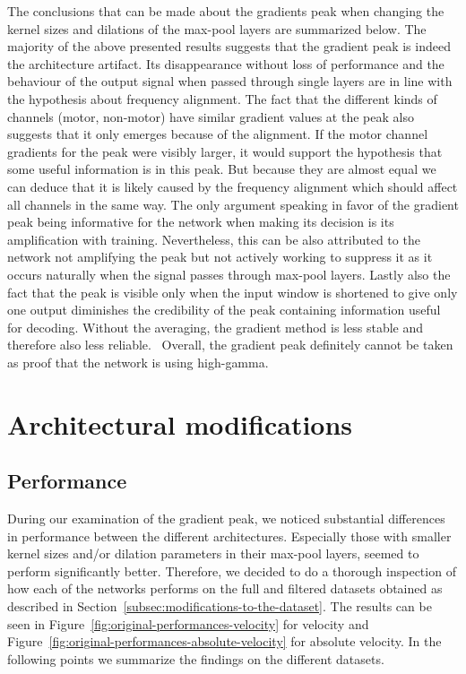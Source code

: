 The conclusions that can be made about the gradients peak when changing the kernel sizes and dilations of the max-pool layers are summarized below.
The majority of the above presented results suggests that the gradient peak is indeed the architecture artifact.
Its disappearance without loss of performance and the behaviour of the output signal when passed through single layers are in line with the hypothesis about frequency alignment.
The fact that the different kinds of channels (motor, non-motor) have similar gradient values at the peak also suggests that it only emerges because of the alignment.
If the motor channel gradients for the peak were visibly larger, it would support the hypothesis that some useful information is in this peak.
But because they are almost equal we can deduce that it is likely caused by the frequency alignment which should affect all channels in the same way.
The only argument speaking in favor of the gradient peak being informative for the network when making its decision is its amplification with training.
Nevertheless, this can be also attributed to the network not amplifying the peak but not actively working to suppress it as it occurs naturally when the signal passes through max-pool layers.
Lastly also the fact that the peak is visible only when the input window is shortened to give only one output diminishes the credibility of the peak containing information useful for decoding.
Without the averaging, the gradient method is less stable and therefore also less reliable.~
Overall, the gradient peak definitely cannot be taken as proof that the network is using high-gamma.

\section{Architectural modifications}\label{sec:architectural-modifications}
\subsection{Performance}\label{subsec:performance}
During our examination of the gradient peak, we noticed substantial differences in performance between the different architectures.
Especially those with smaller kernel sizes and/or dilation parameters in their max-pool layers, seemed to perform significantly better.
Therefore, we decided to do a thorough inspection of how each of the networks performs on the full and filtered datasets obtained as described in Section~\ref{subsec:modifications-to-the-dataset}.
The results can be seen in Figure~\ref{fig:original-performances-velocity} for velocity and Figure~\ref{fig:original-performances-absolute-velocity} for absolute velocity.
In the following points we summarize the findings on the different datasets.


